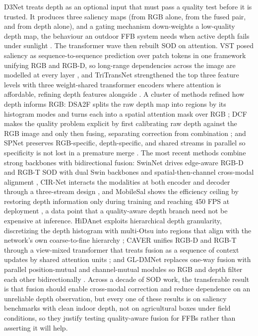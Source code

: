 D3Net treats depth as an optional input that must pass a quality test before it is trusted. It produces three saliency maps (from RGB alone, from the fused pair, and from depth alone), and a gating mechanism down-weights a low-quality depth map, the behaviour an outdoor FFB system needs when active depth fails under sunlight \cite{fan2020d3net}. The transformer wave then rebuilt SOD on attention. VST posed saliency as sequence-to-sequence prediction over patch tokens in one framework unifying RGB and RGB-D, so long-range dependencies across the image are modelled at every layer \cite{liu2021vst}, and TriTransNet strengthened the top three feature levels with three weight-shared transformer encoders where attention is affordable, refining depth features alongside \cite{liu2021tritransnet}. A cluster of methods refined how depth informs RGB: DSA2F splits the raw depth map into regions by its histogram modes and turns each into a spatial attention mask over RGB \cite{sun2021dsa2f}; DCF makes the quality problem explicit by first calibrating raw depth against the RGB image and only then fusing, separating correction from combination \cite{ji2021dcf}; and SPNet preserves RGB-specific, depth-specific, and shared streams in parallel so specificity is not lost in a premature merge \cite{zhou2021spnet}. The most recent methods combine strong backbones with bidirectional fusion: SwinNet drives edge-aware RGB-D and RGB-T SOD with dual Swin backbones and spatial-then-channel cross-modal alignment \cite{liu2021swinnet}, CIR-Net interacts the modalities at both encoder and decoder through a three-stream design \cite{cong2022cirnet}, and MobileSal shows the efficiency ceiling by restoring depth information only during training and reaching 450 FPS at deployment \cite{wu2022mobilesal}, a data point that a quality-aware depth branch need not be expensive at inference. HiDAnet exploits hierarchical depth granularity, discretizing the depth histogram with multi-Otsu into regions that align with the network's own coarse-to-fine hierarchy \cite{wu2023hidanet}; CAVER unifies RGB-D and RGB-T through a view-mixed transformer that treats fusion as a sequence of context updates by shared attention units \cite{pang2023caver}; and GL-DMNet replaces one-way fusion with parallel position-mutual and channel-mutual modules so RGB and depth filter each other bidirectionally \cite{yi2025gldmnet}. Across a decade of SOD work, the transferable result is that fusion should enable cross-modal correction and reduce dependence on an unreliable depth observation, but every one of these results is on saliency benchmarks with clean indoor depth, not on agricultural boxes under field conditions, so they justify testing quality-aware fusion for FFBs rather than asserting it will help.

